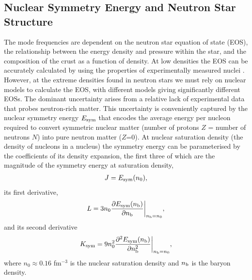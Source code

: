 \documentclass[fleqn,usenatbib]{mnras}
\begin{document}
\subsection{Nuclear Symmetry Energy and Neutron Star Structure}
\hspace{\parindent}The mode frequencies are dependent on the neutron star equation of state (EOS), the relationship between the energy density and pressure within the star, and the composition of the crust as a function of density. At low densities the EOS can be accurately calculated by using the properties of experimentally measured nuclei \citep{baym1971ground}. However, at the extreme densities found in neutron stars we must rely on nuclear models to calculate the EOS, with different models giving significantly different EOSs. The dominant uncertainty arises from a relative lack of experimental data that probes neutron-rich matter. This uncertainty is conveniently captured by the nuclear symmetry energy $E_{\rm sym}$ that encodes the average energy per nucleon required to convert symmetric nuclear matter (number of protons $Z$ = number of neutrons $N$) into pure neutron matter ($Z$=0). At nuclear saturation density (the density of nucleons in a nucleus) the symmetry energy can be parameterised by the coefficients of its density expansion, the first three of which are the magnitude of the symmetry energy at saturation density,
\begin{align}
J=E_{\rm sym}(n_0),    
\label{eq:sym_J}
\end{align}
\noindent its first derivative,
\begin{align}
L=3n_0\frac{\partial E_{\rm sym}(n_{\rm b})}{\partial n_{\rm b}}\biggr\rvert_{n_{\rm b}=n_0},  
\label{eq:sym_L}
\end{align}
\noindent and its second derivative
\begin{align}
K_{\rm sym}=9n_0^2\frac{\partial^2 E_{\rm sym}(n_{\rm b})}{\partial n_{\rm b}^2}\biggr\rvert_{n_{\rm b}=n_0},
\label{eq:sym_K}
\end{align}
\noindent where $n_0\approx 0.16$ fm$^{-3}$ is the nuclear saturation density and $n_{\rm b}$ is the baryon density.
\end{document}
